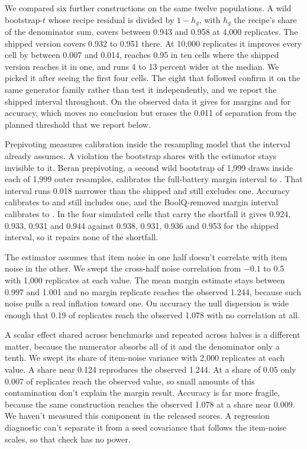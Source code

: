 We compared six further constructions on the same twelve populations. A wild bootstrap-$t$ whose recipe residual is divided by $1-h_g$, with $h_g$ the recipe's share of the denominator sum, covers between 0.943 and 0.958 at 4,000 replicates. The shipped version covers 0.932 to 0.951 there. At 10,000 replicates it improves every cell by between 0.007 and 0.014, reaches 0.95 in ten cells where the shipped version reaches it in one, and runs 4 to 13 percent wider at the median. We picked it after seeing the first four cells. The eight that followed confirm it on the same generator family rather than test it independently, and we report the shipped interval throughout. On the observed data it gives  for margins and  for accuracy, which moves no conclusion but erases the 0.011 of separation from the planned threshold that we report below.

Prepivoting measures calibration inside the resampling model that the interval already assumes. A violation the bootstrap shares with the estimator stays invisible to it. Beran prepivoting, a second wild bootstrap of 1,999 draws inside each of 1,999 outer resamples, calibrates the full-battery margin interval to . That interval runs 0.018 narrower than the shipped  and still excludes one. Accuracy calibrates to  and still includes one, and the BoolQ-removed margin interval calibrates to . In the four simulated cells that carry the shortfall it gives 0.924, 0.933, 0.931 and 0.944 against 0.938, 0.931, 0.936 and 0.953 for the shipped interval, so it repairs none of the shortfall.

The estimator assumes that item noise in one half doesn't correlate with item noise in the other. We swept the cross-half noise correlation from $-0.1$ to 0.5 with 1,000 replicates at each value. The mean margin estimate stays between 0.997 and 1.001 and no margin replicate reaches the observed 1.244, because such noise pulls a real inflation toward one. On accuracy the null dispersion is wide enough that 0.19 of replicates reach the observed 1.078 with no correlation at all.

A scalar effect shared across benchmarks and repeated across halves is a different matter, because the numerator absorbs all of it and the denominator only a tenth. We swept its share of item-noise variance with 2,000 replicates at each value. A share near 0.124 reproduces the observed 1.244. At a share of 0.05 only 0.007 of replicates reach the observed value, so small amounts of this contamination don't explain the margin result. Accuracy is far more fragile, because the same construction reaches the observed 1.078 at a share near 0.009. We haven't measured this component in the released scores. A regression diagnostic can't separate it from a seed covariance that follows the item-noise scales, so that check has no power.

